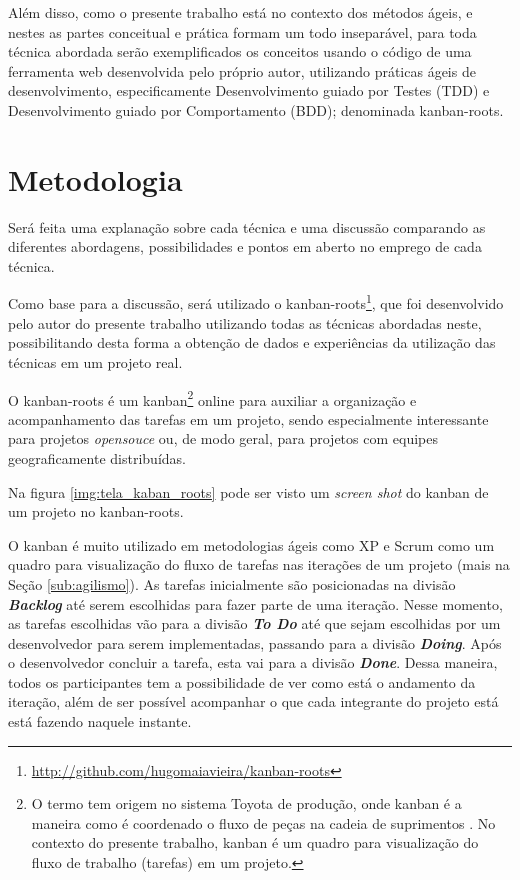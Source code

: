 Além disso, como o presente trabalho está no contexto dos métodos ágeis, e nestes as partes conceitual e prática formam um todo inseparável, para toda técnica abordada serão exemplificados os conceitos usando o código de uma ferramenta web desenvolvida pelo próprio autor, utilizando práticas ágeis de desenvolvimento, especificamente Desenvolvimento guiado por Testes (TDD) e Desenvolvimento guiado por Comportamento (BDD); denominada kanban-roots.

\section{Metodologia}

Será feita uma explanação sobre cada técnica e uma discussão comparando as diferentes abordagens, possibilidades e pontos em aberto no emprego de cada técnica.

Como base para a discussão, será utilizado o kanban-roots\footnote{\url{http://github.com/hugomaiavieira/kanban-roots}}, que foi desenvolvido pelo autor do presente trabalho utilizando todas as técnicas abordadas neste, possibilitando desta forma a obtenção de dados e experiências da utilização das técnicas em um projeto real.

O kanban-roots é um kanban\footnote{O termo tem origem no sistema Toyota de produção, onde kanban é a maneira como é coordenado o fluxo de peças na cadeia de suprimentos  \cite{AMaquinaQueMudouOMundo}. No contexto do presente trabalho, kanban é um quadro para visualização do fluxo de trabalho (tarefas) em um projeto.} online para auxiliar a organização e acompanhamento das tarefas em um projeto, sendo especialmente interessante para projetos \textit{opensouce} ou, de modo geral, para projetos com equipes geograficamente distribuídas.

Na figura \ref{img:tela_kaban_roots} pode ser visto um \textit{screen shot} do kanban de um projeto no kanban-roots.

O kanban é muito utilizado em metodologias ágeis como XP e Scrum como um quadro para visualização do fluxo de tarefas nas iterações de um projeto (mais na Seção \ref{sub:agilismo}). As tarefas inicialmente são posicionadas na divisão \textbf{\textit{Backlog}} até serem escolhidas para fazer parte de uma iteração. Nesse momento, as tarefas escolhidas vão para a divisão \textbf{\textit{To Do}} até que sejam escolhidas por um desenvolvedor para serem implementadas, passando para a divisão \textbf{\textit{Doing}}. Após o desenvolvedor concluir a tarefa, esta vai para a divisão \textbf{\textit{Done}}. Dessa maneira, todos os participantes tem a possibilidade de ver como está o andamento da iteração, além de ser possível acompanhar o que cada integrante do projeto está está fazendo naquele instante.

